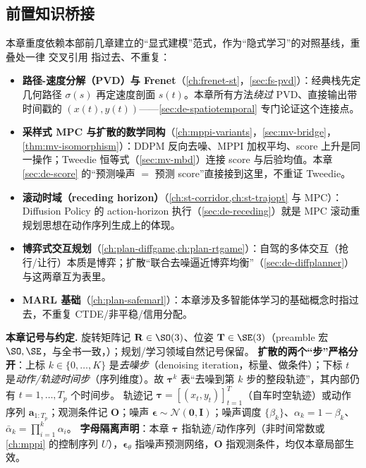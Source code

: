 \subsection*{前置知识桥接}
本章重度依赖本部前几章建立的“显式建模”范式，作为“隐式学习”的对照基线，重叠处一律 交叉引用 指过去、不重复：
\begin{itemize}
  \item \textbf{路径-速度分解（PVD）与 Frenet}（\cref{ch:frenet-st}，\cref{sec:fs-pvd}）：经典栈先定几何路径 $\sigma(s)$ 再定速度剖面 $s(t)$。本章所有方法\emph{绕过} PVD、直接输出带时间戳的 $(x(t),y(t))$——\cref{sec:de-spatiotemporal} 专门论证这个连接点。
  \item \textbf{采样式 MPC 与扩散的数学同构}（\cref{ch:mppi-variants}，\cref{sec:mv-bridge}，\cref{thm:mv-isomorphism}）：DDPM 反向去噪、MPPI 加权平均、score 上升是同一操作；Tweedie 恒等式（\cref{sec:mv-mbd}）连接 score 与后验均值。本章 \cref{sec:de-score} 的“预测噪声 $=$ 预测 score”直接接到这里，不重证 Tweedie。
  \item \textbf{滚动时域（receding horizon）}（\cref{ch:st-corridor,ch:st-trajopt} 与 MPC）：Diffusion Policy 的 action-horizon 执行（\cref{sec:de-receding}）就是 MPC 滚动重规划思想在动作序列生成上的体现。
  \item \textbf{博弈式交互规划}（\cref{ch:plan-diffgame,ch:plan-rtgame}）：自驾的多体交互（抢行/让行）本质是博弈；扩散“联合去噪逼近博弈均衡”（\cref{sec:de-diffplanner}）与这两章互为表里。
  \item \textbf{MARL 基础}（\cref{ch:plan-safemarl}）：本章涉及多智能体学习的基础概念时指过去，不重复 CTDE/非平稳/信用分配。
\end{itemize}

\begin{note}
\textbf{本章记号与约定.}\;
旋转矩阵记 $\mathbf{R}\in\SO(3)$、位姿 $\mathbf{T}\in\SE(3)$（preamble 宏 $\SO,\SE$，与全书一致，）；规划/学习领域自然记号保留。
\textbf{扩散的两个“步”严格分开}：上标 $k\in\{0,\dots,K\}$ 是\emph{去噪步}（denoising iteration，标量、做条件）；下标 $t$ 是\emph{动作/轨迹时间步}（序列维度）。故 $\boldsymbol{\tau}^k$ 表“去噪到第 $k$ 步的整段轨迹”，其内部仍有 $t=1,\dots,T_p$ 个时间步。
轨迹记 $\boldsymbol{\tau}=[(x_t,y_t)]_{t=1}^{T}$（自车时空轨迹）或动作序列 $\mathbf{a}_{1:T_p}$；观测条件记 $\mathbf{O}$；噪声 $\boldsymbol{\epsilon}\sim\mathcal{N}(\mathbf{0},\mathbf{I})$；噪声调度 $\{\beta_k\}$、$\alpha_k=1-\beta_k$、$\bar\alpha_k=\prod_{i=1}^{k}\alpha_i$。
\textbf{字母隔离声明}：本章 $\boldsymbol{\tau}$ 指轨迹/动作序列（非时间常数或 \cref{ch:mppi} 的控制序列 $U$），$\boldsymbol{\epsilon}_\theta$ 指噪声预测网络，$\mathbf{O}$ 指观测条件，均仅本章局部生效。
\end{note}

